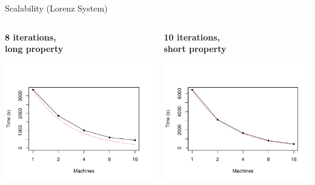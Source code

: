 \documentclass[xcolor=svgnames,14pt]{beamer}
\begin{document}
\begin{frame}{Scalability (Lorenz System)}%
	\begin{columns}[2]
		\begin{column}{0.5\textwidth}
			\begin{center}
				\textbf{8 iterations,\\long property}

				\includegraphics[width=\textwidth]{lorenz84-long-property-time}
			\end{center}
		\end{column}
		\begin{column}{0.5\textwidth}
			\begin{center}
				\textbf{10 iterations,\\short property}

				\includegraphics[width=\textwidth]{lorenz84-iterations-time}
			\end{center}
		\end{column}
	\end{columns}
\end{frame}%
\end{document}

